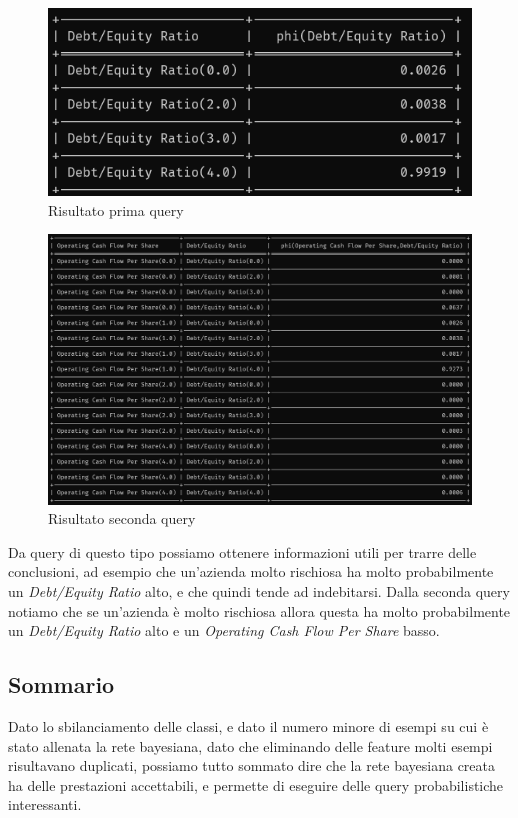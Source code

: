 \begin{figure}[H]
    \centering
    \includegraphics[scale=0.5]{img/firstq.png}
    \caption{Risultato prima query}
\end{figure}

\begin{figure}[H]
    \centering
    \includegraphics[scale=0.5]{img/secondq.png}
    \caption{Risultato seconda query}
\end{figure}

\noindent Da query di questo tipo possiamo ottenere informazioni utili per trarre delle conclusioni, ad esempio che un'azienda molto rischiosa ha molto probabilmente un \textit{Debt/Equity Ratio} alto, e che quindi tende ad indebitarsi. Dalla seconda query notiamo che se un'azienda è molto rischiosa allora questa ha molto probabilmente un \textit{Debt/Equity Ratio} alto e un \textit{Operating Cash Flow Per Share} basso.

\subsection{Sommario}

\noindent Dato lo sbilanciamento delle classi, e dato il numero minore di esempi su cui è stato allenata la rete bayesiana, dato che eliminando delle feature molti esempi risultavano duplicati, possiamo tutto sommato dire che la rete bayesiana creata ha delle prestazioni accettabili, e permette di eseguire delle query probabilistiche interessanti.
